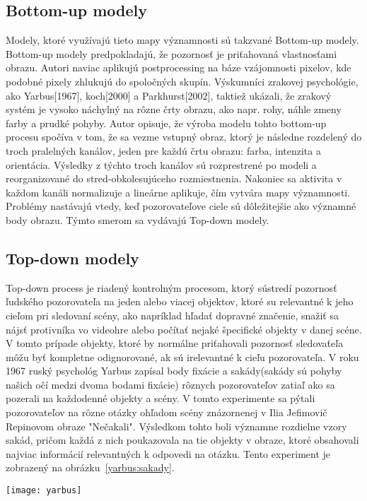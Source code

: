 \documentclass[10pt,twoside,slovak,a4paper]{article}
\begin{document}
\subsection{Bottom-up modely} \label{ina}
Modely, ktoré využívajú tieto mapy významnosti sú takzvané Bottom-up modely. Bottom-up modely predpokladajú, že pozornosť je priťahovaná vlastnosťami obrazu. Autori\cite{bottom} naviac aplikujú postprocessing na báze vzájomnosti pixelov, kde podobné pixely zhlukujú do spoločných skupín. Výskumníci zrakovej psychológie, ako Yarbus[1967], koch[2000] a Parkhurst[2002], taktiež ukázali, že zrakový systém je vysoko náchylný na rôzne črty obrazu, ako napr. rohy, náhle zmeny farby a prudké pohyby. Autor\cite{saliency:vytvar} opisuje, že výroba modelu tohto bottom-up procesu spočíva v tom, že sa vezme vstupný obraz, ktorý je následne rozdelený do troch pralelných kanálov, jeden pre každú črtu obrazu: farba, intenzita a orientácia. Výsledky z týchto troch kanálov sú rozprestrené po modeli a reorganizované do stred-obkolesujúceho rozmiestnenia. Nakoniec sa aktivita v každom kanáli normalizuje a lineárne aplikuje, čím vytvára mapy významnosti. Problémy nastávajú vtedy, keď pozorovateľove ciele sú dôležitejšie ako významné body obrazu. Týmto smerom sa vydávajú Top-down modely.    
\subsection{Top-down modely} \label{nejaka}
Top-down process je riadený kontrolným procesom, ktorý sústredí pozornosť ľudského pozorovateľa na jeden alebo viacej objektov, ktoré su relevantné k jeho cieľom pri sledovaní scény, ako napríklad hľadať dopravné značenie, snažiť sa nájsť  protivníka vo videohre alebo počítať nejaké špecifické objekty v danej scéne. V tomto prípade objekty, ktoré by normálne priťahovali pozornosť sledovaťeľa môžu byť kompletne odignorované, ak sú irelevantné k cieľu pozorovateľa. V roku 1967 ruský psychológ Yarbus zapísal body fixácie a sakády(sakády sú pohyby našich očí medzi dvoma bodami fixácie) rôznych pozorovateľov zatiaľ ako sa pozerali na každodenné objekty a scény. V tomto experimente sa pýtali pozorovateľov na rôzne otázky ohľadom scény znázornenej v Ilia Jefimovič Repinovom  obraze "Nečakali". Výsledkom tohto boli významne rozdielne vzory sakád, pričom každá z nich poukazovala na tie objekty v obraze, ktoré obsahovali najviac informácií relevantných k odpovedi na otázku. Tento experiment je zobrazený na obrázku~\ref{yarbus:sakady}.
\begin{figure*}[tbh]
\centering
\texttt{[image: yarbus]}
\caption{ Dopad úloh na pohyb očí. Repinov obraz bol pozorovaný subjektami s rozlišnými inštrukciami(obrázky idú v poradí z ľava do prava z hora dole):1. Voľné pozorovanie, 2. Odhadnite ich vek, 3. Zistite čo robili pred tým, ako sa ukázal nečakaný hosť, 4. Zapamätajte si oblečenie, ktoré majú na sebe postavy oblečené, 5. Zapamätajte si pozíciu ľudí a objektov v izbe a 6. Predpovedajte, ako dlho bol nečakaný hosť preč od danej rodiny[Yarbus 1967].}
\label{yarbus:sakady}
\end{figure*}
\end{document}
